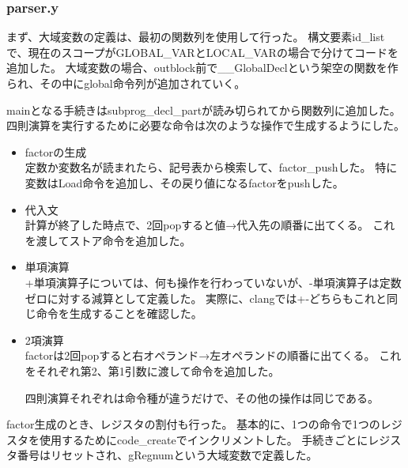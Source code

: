 \subsubsection{parser.y}
まず、大域変数の定義は、最初の関数列を使用して行った。
構文要素id\_listで、現在のスコープがGLOBAL\_VARとLOCAL\_VARの場合で分けてコードを追加した。
大域変数の場合、outblock前で\_\_GlobalDeclという架空の関数を作られ、その中にglobal命令列が追加されていく。

mainとなる手続きはsubprog\_decl\_partが読み切られてから関数列に追加した。\\

四則演算を実行するために必要な命令は次のような操作で生成するようにした。
\begin{itemize}
  \item factorの生成\\
        定数か変数名が読まれたら、記号表から検索して、factor\_pushした。
        特に変数はLoad命令を追加し、その戻り値になるfactorをpushした。
  \item 代入文\\
        計算が終了した時点で、2回popすると値→代入先の順番に出てくる。
        これを渡してストア命令を追加した。
  \item 単項演算\\
        +単項演算子については、何も操作を行わっていないが、-単項演算子は定数ゼロに対する減算として定義した。
        実際に、clangでは+-どちらもこれと同じ命令を生成することを確認した。
  \item 2項演算\\
        factorは2回popすると右オペランド→左オペランドの順番に出てくる。
        これをそれぞれ第2、第1引数に渡して命令を追加した。

        四則演算それぞれは命令種が違うだけで、その他の操作は同じである。
\end{itemize}

factor生成のとき、レジスタの割付も行った。
基本的に、1つの命令で1つのレジスタを使用するためにcode\_createでインクリメントした。
手続きごとにレジスタ番号はリセットされ、gRegnumという大域変数で定義した。

